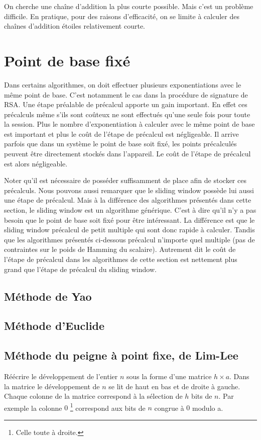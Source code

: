 On cherche une chaîne d'addition la plus courte possible. Mais c'est un problème difficile. En pratique, pour des raisons d'efficacité, on se limite à calculer des chaînes d'addition étoiles relativement courte.



\section{Point de base fixé}
Dans certains algorithmes, on doit effectuer plusieurs exponentiations avec le même point de base. C'est notamment le cas dans la procédure de signature de RSA. Une étape préalable de précalcul apporte un gain important. En effet ces précalculs même s'ils sont coûteux ne sont effectués qu'une seule fois pour toute la session. Plus le nombre d'exponentiation à calculer avec le même point de base est important et plus le coût de l'étape de précalcul est négligeable. Il arrive parfois que dans un système le point de base soit fixé, les points précalculés peuvent être directement stockés dans l'appareil. Le coût de l'étape de précalcul est alors négligeable. 

Noter qu'il est nécessaire de posséder suffisamment de place afin de stocker ces précalculs. Nous pouvons aussi remarquer que le sliding window possède lui aussi une étape de précalcul. Mais à la différence des algorithmes présentés dans cette section, le sliding window est un algorithme générique. C'est à dire qu'il n'y a pas besoin que le point de base soit fixé pour être intéressant. La différence est que le sliding window précalcul de petit multiple qui sont donc rapide à calculer. Tandis que les algorithmes présentés ci-dessous précalcul n'importe quel multiple (pas de contraintes sur le poids de Hamming du scalaire). Autrement dit le coût de l'étape de précalcul dans les algorithmes de cette section est nettement plus grand que l'étape de précalcul du sliding window.

\subsection{Méthode de Yao}

\subsection{Méthode d'Euclide}

\subsection{Méthode du peigne à point fixe, de Lim-Lee}
Réécrire le développement de l'entier $n$ sous la forme d'une matrice $h \times a$. Dans la matrice le développement de $n$ se lit de haut en bas et de droite à gauche. Chaque colonne de la matrice correspond à la sélection de $h$ bits de $n$. Par exemple la colonne $0$ \footnote{Celle toute à droite.} correspond aux bits de $n$ congrue à $0$ modulo a. 

